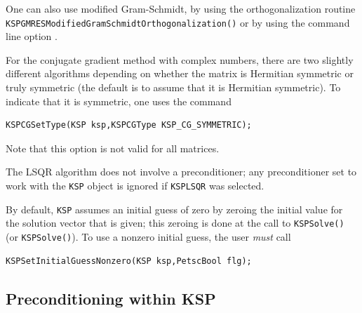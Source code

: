 One can also use
modified Gram-Schmidt,
by using the orthogonalization routine \break
\lstinline{KSPGMRESModifiedGramSchmidtOrthogonalization()} or by using the command line option
. 

For the conjugate gradient method with complex numbers, there are two
slightly different algorithms depending on whether the matrix is
Hermitian symmetric or truly symmetric (the default is to assume that
it is Hermitian symmetric). To indicate that it is symmetric, one uses the command
\begin{lstlisting}
KSPCGSetType(KSP ksp,KSPCGType KSP_CG_SYMMETRIC);
\end{lstlisting}
Note that this option is not valid for all matrices.

The LSQR algorithm does not involve a preconditioner; any preconditioner
set to work with the \lstinline{KSP} object is ignored if \lstinline{KSPLSQR} was selected.

By default, \lstinline{KSP} assumes an initial guess of zero by zeroing the initial
value for the solution vector that is given; this zeroing is done at the
call to \lstinline{KSPSolve()} (or \lstinline{KSPSolve()}). To use a nonzero
initial guess, the user {\em must} call
\begin{lstlisting}
KSPSetInitialGuessNonzero(KSP ksp,PetscBool flg);
\end{lstlisting}

\subsection{Preconditioning within KSP}
\label{sec_ksppc}


